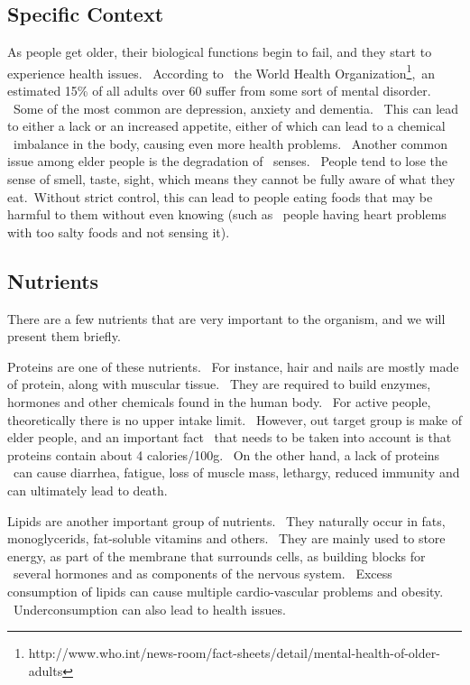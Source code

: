 \subsection{Specific Context}
\label{subsec:introduction-specific-context}

As people get older, their biological functions begin to fail, and they start to experience health issues. \
According to \
the World Health Organization\footnote{http://www.who.int/news-room/fact-sheets/detail/mental-health-of-older-adults},\
an estimated 15\% of all adults over 60 suffer from some sort of mental disorder. \
Some of the most common are depression, anxiety and dementia. \
This can lead to either a lack or an increased appetite, either of which can lead to a chemical \
imbalance in the body, causing even more health problems. \
Another common issue among elder people is the degradation of \
senses. \
People tend to lose the sense of smell, taste, sight, which means they cannot be fully aware of what they eat.\
Without strict control, this can lead to people eating foods that may be harmful to them without even knowing (such as \
people having heart problems with too salty foods and not sensing it).


\subsection{Nutrients}
\label{subsec:introduction-nutrients}
There are a few nutrients that are very important to the organism, and we will present them briefly.

Proteins are one of these nutrients. \
For instance, hair and nails are mostly made of protein, along with muscular tissue. \
They are required to build enzymes, hormones and other chemicals found in the human body. \
For active people, theoretically there is no upper intake limit. \
However, out target group is make of elder people, and an important fact \
that needs to be taken into account is that proteins contain about 4 calories/100g. \
On the other hand, a lack of proteins \
can cause diarrhea, fatigue, loss of muscle mass, lethargy, reduced immunity and can ultimately lead to death.

Lipids are another important group of nutrients. \
They naturally occur in fats, monoglycerids, fat-soluble vitamins and others. \
They are mainly used to store energy, as part of the membrane that surrounds cells, as building blocks for \
several hormones and as components of the nervous system. \
Excess consumption of lipids can cause multiple cardio-vascular problems and obesity. \
Underconsumption can also lead to health issues.

